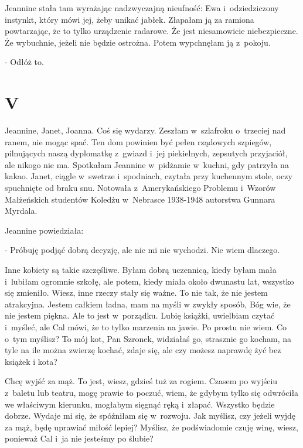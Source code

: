 \documentclass[oneside,polish,12pt,sfheadings]{mwbk}
\begin{document}
Jeannine stała tam wyrażając nadzwyczajną nieufność: Ewa i~odziedziczony
instynkt, który mówi jej, żeby unikać jabłek. Złapałam ją za ramiona
powtarzając, że to tylko urządzenie radarowe. Że jest niesamowicie
niebezpieczne. Że wybuchnie, jeżeli nie będzie ostrożna. Potem wypchnęłam
ją z~pokoju.

- Odłóż to.

\chapter{V}

Jeannine, Janet, Joanna. Coś się wydarzy. Zeszłam w~szlafroku o~trzeciej
nad ranem, nie mogąc spać. Ten dom powinien być pełen rządowych szpiegów,
pilnujących naszą dyplomatkę z~gwiazd i~jej piekielnych, zepsutych
przyjaciół, ale nikogo nie ma. Spotkałam Jeannine w~pidżamie w~kuchni,
gdy patrzyła na kakao. Janet, ciągle w~swetrze i~spodniach, czytała
przy kuchennym stole, oczy spuchnięte od braku snu. Notowała z~Amerykańskiego
Problemu i~Wzorów Małżeńskich studentów Koledżu w~Nebrasce 1938-1948
autorstwa Gunnara Myrdala.

Jeannine powiedziała: 

- Próbuję podjąć dobrą decyzję, ale nic mi nie wychodzi. Nie wiem dlaczego.

Inne kobiety są takie szczęśliwe. Byłam dobrą uczennicą, kiedy byłam
mała i~lubiłam ogromnie szkołę, ale potem, kiedy miała około dwunastu
lat, wszystko się zmieniło. Wiesz, inne rzeczy stały się ważne. To
nie tak, że nie jestem atrakcyjna. Jestem całkiem ładna, mam na myśli
w zwykły sposób, Bóg wie, że nie jestem piękna. Ale to jest w~porządku.
Lubię książki, uwielbiam czytać i~myśleć, ale Cal mówi, że to tylko
marzenia na jawie. Po prostu nie wiem. Co o~tym myślisz? To mój kot,
Pan Szronek, widziałaś go, strasznie go kocham, na tyle na ile można
zwierzę kochać, zdaje się, ale czy możesz naprawdę żyć bez książek
i kota?

Chcę wyjść za mąż. To jest, wiesz, gdzieś tuż za rogiem. Czasem po
wyjściu z~baletu lub teatru, mogę prawie to poczuć, wiem, że gdybym
tylko się odwróciła we właściwym kierunku, mogłabym sięgnąć ręką i~złapać. Wszystko będzie dobrze. Wydaje mi się, że spóźniłam się w~rozwoju. Jak myślisz, czy jeżeli wyjdę za mąż, będę uprawiać miłość
lepiej? Myślisz, że podświadomie czuję winę, wiesz, ponieważ Cal i~ja nie jesteśmy po ślubie?
\end{document}
